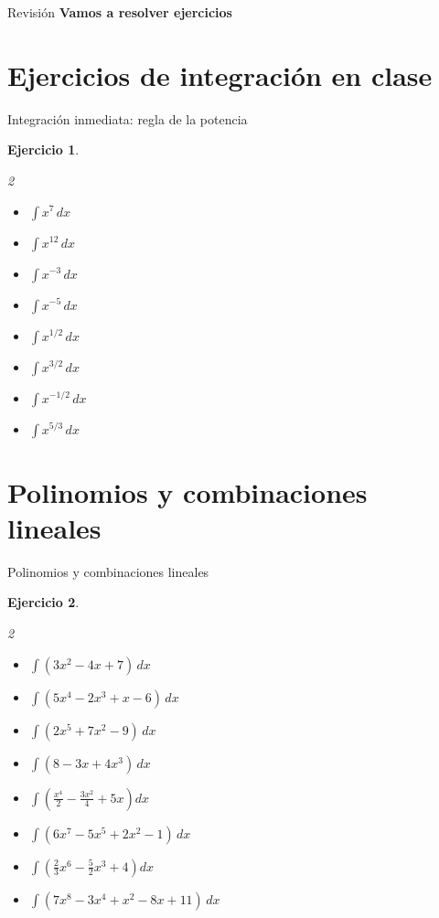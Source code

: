 \documentclass[10pt,aspectratio=169]{beamer}
\newtheorem{Ejer}{Ejercicio}
\begin{document}
\begin{frame}{Revisi\'on}
\huge{\textbf{
Vamos a resolver ejercicios}}
\end{frame}

\section{Ejercicios de integración en clase}

\begin{frame}{Integración inmediata: regla de la potencia}
\begin{Ejer}
\begin{multicols}{2}
\begin{itemize}
\item $\displaystyle \int x^7\,dx$
\item $\displaystyle \int x^{12}\,dx$
\item $\displaystyle \int x^{-3}\,dx$
\item $\displaystyle \int x^{-5}\,dx$
\item $\displaystyle \int x^{1/2}\,dx$
\item $\displaystyle \int x^{3/2}\,dx$
\item $\displaystyle \int x^{-1/2}\,dx$
\item $\displaystyle \int x^{5/3}\,dx$
\end{itemize}
\end{multicols}
\end{Ejer}
\end{frame}




\section{Polinomios y combinaciones lineales}
\begin{frame}{Polinomios y combinaciones lineales}

\begin{Ejer}
\begin{multicols}{2}
\begin{itemize}
\item $\displaystyle \int(3x^2-4x+7)\,dx$
\item $\displaystyle \int(5x^4-2x^3+x-6)\,dx$
\item $\displaystyle \int(2x^5+7x^2-9)\,dx$
\item $\displaystyle \int(8-3x+4x^3)\,dx$
\item $\displaystyle \int\left(\frac{x^4}{2}-\frac{3x^2}{4}+5x\right)dx$
\item $\displaystyle \int(6x^7-5x^5+2x^2-1)\,dx$
\item $\displaystyle \int\left(\frac{2}{3}x^6-\frac{5}{2}x^3+4\right)dx$
\item $\displaystyle \int(7x^8-3x^4+x^2-8x+11)\,dx$
\end{itemize}
\end{multicols}
\end{Ejer}
\end{frame}
\end{document}
